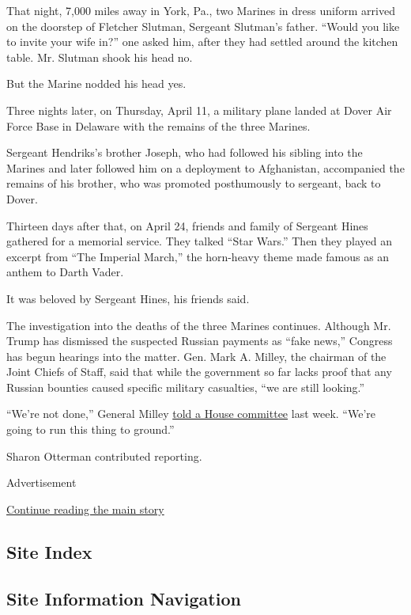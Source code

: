 That night, 7,000 miles away in York, Pa., two Marines in dress uniform
arrived on the doorstep of Fletcher Slutman, Sergeant Slutman's father.
``Would you like to invite your wife in?'' one asked him, after they had
settled around the kitchen table. Mr. Slutman shook his head no.

But the Marine nodded his head yes.

Three nights later, on Thursday, April 11, a military plane landed at
Dover Air Force Base in Delaware with the remains of the three Marines.

Sergeant Hendriks's brother Joseph, who had followed his sibling into
the Marines and later followed him on a deployment to Afghanistan,
accompanied the remains of his brother, who was promoted posthumously to
sergeant, back to Dover.

Thirteen days after that, on April 24, friends and family of Sergeant
Hines gathered for a memorial service. They talked ``Star Wars.'' Then
they played an excerpt from ``The Imperial March,'' the horn-heavy theme
made famous as an anthem to Darth Vader.

It was beloved by Sergeant Hines, his friends said.

The investigation into the deaths of the three Marines continues.
Although Mr. Trump has dismissed the suspected Russian payments as
``fake news,'' Congress has begun hearings into the matter. Gen. Mark A.
Milley, the chairman of the Joint Chiefs of Staff, said that while the
government so far lacks proof that any Russian bounties caused specific
military casualties, ``we are still looking.''

``We're not done,'' General Milley
\href{https://www.nytimes.com/2020/07/09/us/politics/congress-russian-bounties.html}{told
a House committee} last week. ``We're going to run this thing to
ground.''

Sharon Otterman contributed reporting.

Advertisement

\protect\hyperlink{after-bottom}{Continue reading the main story}

\hypertarget{site-index}{%
\subsection{Site Index}\label{site-index}}

\hypertarget{site-information-navigation}{%
\subsection{Site Information
Navigation}\label{site-information-navigation}}

